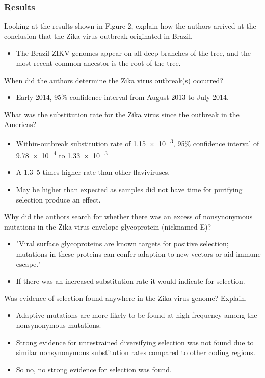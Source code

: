 \documentclass[12pt,a4paper]{article}
\begin{document}
\subsubsection{Results}
\begin{itemize}
    {\color{G-Moon}\item Looking at the results shown in Figure 2, explain how the authors arrived at the conclusion that the Zika virus outbreak originated in Brazil.}
        \begin{itemize}
            \item The Brazil ZIKV genomes appear on all deep branches of the tree, and the most recent common ancestor is the root of the tree.
        \end{itemize}
    {\color{G-Moon}\item When did the authors determine the Zika virus outbreak(s) occurred?}
        \begin{itemize}
            \item Early 2014, 95\% confidence interval from August 2013 to July 2014.
        \end{itemize}
    {\color{G-Moon}\item What was the substitution rate for the Zika virus since the outbreak in the Americas?}
        \begin{itemize}
            \item Within-outbreak substitution rate of \num{1.15e-3},  95\% confidence interval of \num{9.78e-4} to \num{1.33e-3}
            \item A 1.3--5 times higher rate than other flaviviruses.
            \item May be higher than expected as samples did not have time for purifying selection produce an effect.
        \end{itemize}
    {\color{G-Moon}\item Why did the authors search for whether there was an excess of nonsynonymous mutations in the Zika virus envelope glycoprotein (nicknamed E)?}
        \begin{itemize}
            \item "Viral surface glycoproteins are known targets for positive selection; mutations in these proteins can confer adaption to new vectors or aid immune escape."
            \item If there was an increased substitution rate it would indicate for selection.
        \end{itemize}
    {\color{G-Moon}\item Was evidence of selection found anywhere in the Zika virus genome? Explain.}
        \begin{itemize}
            \item Adaptive mutations are more likely to be found at high frequency among the nonsynonymous mutations.
            \item Strong evidence for unrestrained diversifying selection was not found due to similar nonsynonymous substitution rates compared to other coding regions.
            \item So no, no strong evidence for selection was found.
        \end{itemize}
\end{itemize}
\end{document}
